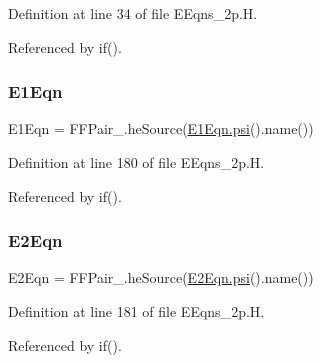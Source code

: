 Definition at line 34 of file E\+Eqns\+\_\+2p.\+H.



Referenced by if().

\mbox{\label{EEqns__2p_8H_a0d64ef58632fbee7a9e6043486109a4f}} 
\subsubsection{\texorpdfstring{E1\+Eqn}{E1Eqn}}
{\footnotesize\ttfamily E1\+Eqn = F\+F\+Pair\+\_\+.\+he\+Source(\hyperlink{UEqn__1pl_8H_a165a34deec3ee505598e511a88831968}{E1\+Eqn.\+psi}().name())}



Definition at line 180 of file E\+Eqns\+\_\+2p.\+H.



Referenced by if().

\mbox{\label{EEqns__2p_8H_aabebc3b50a1fc117e4aaa3b5c894198b}} 
\subsubsection{\texorpdfstring{E2\+Eqn}{E2Eqn}}
{\footnotesize\ttfamily E2\+Eqn = F\+F\+Pair\+\_\+.\+he\+Source(\hyperlink{UEqn__1pl_8H_a165a34deec3ee505598e511a88831968}{E2\+Eqn.\+psi}().name())}



Definition at line 181 of file E\+Eqns\+\_\+2p.\+H.



Referenced by if().

